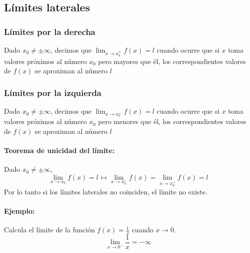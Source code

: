 \subsection{Límites laterales}

\subsubsection{Límites por la derecha} Dado $x_0\neq\pm\infty$, decimos que $\lim_{x \to x_0^+} f(x) = l $ cuando ocurre que si $x$ toma valores próximos al número $x_0$ pero  mayores que él, los correspondientes valores de $f (x)$ se aproximan al número $l$

\subsubsection{Límites por la izquierda} Dado $x_0\neq\pm\infty$, decimos que $\lim_{x \to x_0^-} f(x) = l $ cuando ocurre que si $x$ toma valores próximos al número $x_0$ pero  menores que él, los correspondientes valores de $f (x)$ se aproximan al número $l$

\paragraph{Teorema de unicidad del límite:}
Dado $x_0\neq\pm\infty$,
$$\lim_{x \to x_0} f(x) = l \leftrightarrow \lim_{x \to x_0^-} f(x) = \lim_{x \to x_0^+} f(x)= l $$
Por lo tanto si los límites laterales no coinciden, el límite no existe.

\paragraph{Ejemplo:} Calcula el límite de la función $f(x)=\frac{1}{x}$ cuando $x \to 0$.\\
$$\lim_{x \to 0^-} \frac{1}{x} = -\infty$$



